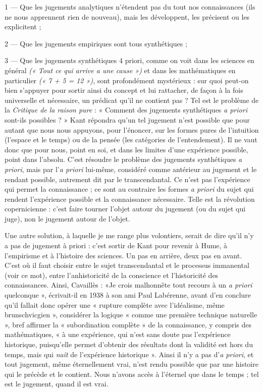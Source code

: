 {1 — Que les jugements analytiques n’étendent pas du tout nos connaissances
(ils ne nous apprennent rien de nouveau), mais les développent, les précisent
ou les explicitent ;

2 — Que les jugements empiriques sont tous synthétiques ;

3 — Que les jugements synthétiques 4 priori, comme on voit dans les
sciences en général {\it (« Tout ce qui arrive a une cause »)} et dans les mathématiques
en particulier {\it (« 7 + 5 = 12 »)}, sont profondément mystérieux : sur quoi
peut-on bien s’appuyer pour sortir ainsi du concept et lui rattacher, de façon à
la fois universelle et nécessaire, un prédicat qu’il ne contient pas ? Tel est le problème
de la {\it Critique de la raison pure} : « Comment des jugements synthétiques
{\it a priori} sont-ils possibles ? » Kant répondra qu’un tel jugement n’est possible
que pour autant que nous nous appuyons, pour l’énoncer, sur les formes pures
de l'intuition (l’espace et le temps) ou de la pensée (les catégories de l’entendement).
Il ne vaut donc que pour nous, point en soi, et dans les limites d’une
expérience possible, point dans l’absolu. C’est résoudre le problème des jugements
synthétiques {\it a priori}, mais par l'{\it a priori} lui-même, considéré comme
antérieur au jugement et le rendant possible, autrement dit par le transcendantal.
Ce n’est pas l'expérience qui permet la connaissance ; ce sont au
contraire les formes {\it a priori} du sujet qui rendent l’expérience possible et la
connaissance nécessaire. Telle est la révolution copernicienne : c’est faire
tourner l’objet autour du jugement (ou du sujet qui juge), non le jugement
autour de l’objet.

Une autre solution, à laquelle je me range plus volontiers, serait de dire
qu'il n’y a pas de jugement à priori : c’est sortir de Kant pour revenir à Hume,
à l’empirisme et à l’histoire des sciences. Un pas en arrière, deux pas en avant.
C’est où il faut choisir entre le sujet transcendantal et le processus immanental
(voir ce mot), entre l’anhistoricité de la conscience et l’historicité des connaissances.
Ainsi, Cavaillès : «Je crois malhonnête tout recours à un {\it a priori}
quelconque », écrivait-il en 1938 à son ami Paul Labérenne, avant d’en
conclure qu’il fallait donc opérer une « rupture complète avec l’idéalisme,
même brunschvicgien », considérer la logique « comme une première technique
naturelle », bref affirmer la « subordination complète » de la connaissance,
y compris des mathématiques, « à une expérience, qui n’est sans doute
pas l'expérience historique, puisqu’elle permet d’obtenir des résultats dont la
validité est hors du temps, mais qui {\it naît} de l’expérience historique ». Ainsi il
n’y a pas d’{\it a priori}, et tout jugement, même éternellement vrai, n’est rendu
possible que par une histoire qui le précède et le contient. Nous n'avons accès
à l’éternel que dans le temps ; tel est le jugement, quand il est vrai.

}
